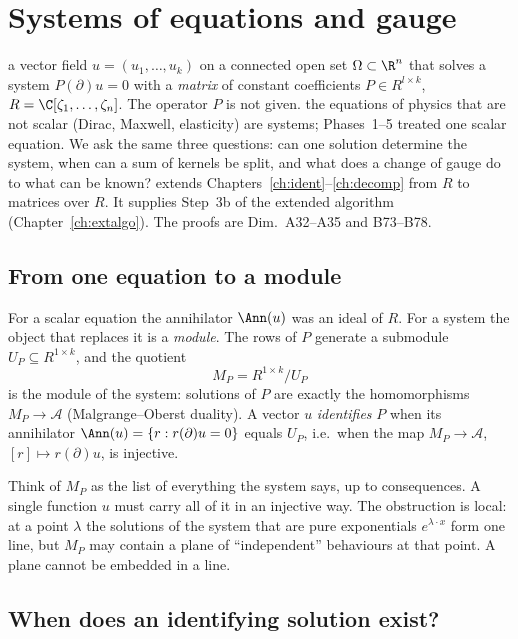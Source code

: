 \chapter{Systems of equations and gauge}\label{ch:systems}
\chapterbrief
{a vector field $u=(u_1,\dots,u_k)$ on a connected open set $\Omega\subset\R^n$ that solves a system $P(\partial)u=0$ with a \emph{matrix} of constant coefficients $P\in R^{l\times k}$, $R=\C[\zeta_1,\dots,\zeta_n]$. The operator $P$ is not given.}
{the equations of physics that are not scalar (Dirac, Maxwell, elasticity) are systems; Phases~1--5 treated one scalar equation. We ask the same three questions: can one solution determine the system, when can a sum of kernels be split, and what does a change of gauge do to what can be known?}
{extends Chapters~\ref{ch:ident}--\ref{ch:decomp} from $R$ to matrices over $R$. It supplies Step~3b of the extended algorithm (Chapter~\ref{ch:extalgo}). The proofs are Dim.~A32--A35 and B73--B78.}

\section{From one equation to a module}

For a scalar equation the annihilator $\Ann(u)$ was an ideal of $R$. For a system the object that replaces it is a \emph{module}. The rows of $P$ generate a submodule $U_P\subseteq R^{1\times k}$, and the quotient
\[
M_P=R^{1\times k}/U_P
\]
is the module of the system: solutions of $P$ are exactly the homomorphisms $M_P\to\mathcal A$ (Malgrange--Oberst duality). A vector $u$ \emph{identifies} $P$ when its annihilator $\Ann(u)=\{r:r(\partial)u=0\}$ equals $U_P$, i.e.\ when the map $M_P\to\mathcal A$, $[r]\mapsto r(\partial)u$, is injective.

\begin{intuition}
Think of $M_P$ as the list of everything the system says, up to consequences. A single function $u$ must carry all of it in an injective way. The obstruction is local: at a point $\lambda$ the solutions of the system that are pure exponentials $e^{\lambda\cdot x}$ form one line, but $M_P$ may contain a plane of ``independent'' behaviours at that point. A plane cannot be embedded in a line.
\end{intuition}

\section{When does an identifying solution exist?}

